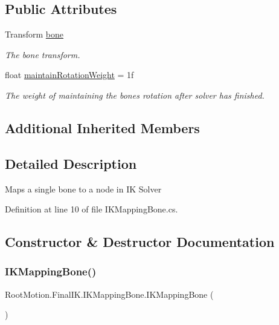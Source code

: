 \subsection*{Public Attributes}
\begin{DoxyCompactItemize}
\item 
Transform \mbox{\hyperlink{class_root_motion_1_1_final_i_k_1_1_i_k_mapping_bone_a9d9f697b00a63ce7c5e5680d97cf8b5f}{bone}}
\begin{DoxyCompactList}\small\item\em The bone transform. \end{DoxyCompactList}\item 
float \mbox{\hyperlink{class_root_motion_1_1_final_i_k_1_1_i_k_mapping_bone_a2d578028cb3d40fff8fdf8ef6d90a7e6}{maintain\+Rotation\+Weight}} = 1f
\begin{DoxyCompactList}\small\item\em The weight of maintaining the bone\textquotesingle{}s rotation after solver has finished. \end{DoxyCompactList}\end{DoxyCompactItemize}
\subsection*{Additional Inherited Members}


\subsection{Detailed Description}
Maps a single bone to a node in IK Solver 



Definition at line 10 of file I\+K\+Mapping\+Bone.\+cs.



\subsection{Constructor \& Destructor Documentation}
\mbox{\label{class_root_motion_1_1_final_i_k_1_1_i_k_mapping_bone_af37ad89a40c913273dbda0cedfa13564}} 
\subsubsection{\texorpdfstring{I\+K\+Mapping\+Bone()}{IKMappingBone()}\hspace{0.1cm}{\footnotesize\ttfamily [1/2]}}
{\footnotesize\ttfamily Root\+Motion.\+Final\+I\+K.\+I\+K\+Mapping\+Bone.\+I\+K\+Mapping\+Bone (\begin{DoxyParamCaption}{ }\end{DoxyParamCaption})}



